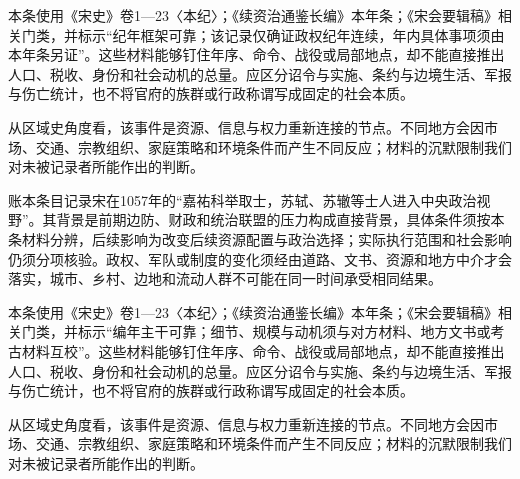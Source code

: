 本条使用《宋史》卷1—23〈本纪〉；《续资治通鉴长编》本年条；《宋会要辑稿》相关门类，并标示“纪年框架可靠；该记录仅确证政权纪年连续，年内具体事项须由本年条另证”。这些材料能够钉住年序、命令、战役或局部地点，却不能直接推出人口、税收、身份和社会动机的总量。应区分诏令与实施、条约与边境生活、军报与伤亡统计，也不将官府的族群或行政称谓写成固定的社会本质。

从区域史角度看，该事件是资源、信息与权力重新连接的节点。不同地方会因市场、交通、宗教组织、家庭策略和环境条件而产生不同反应；材料的沉默限制我们对未被记录者所能作出的判断。

账本条目记录宋在1057年的“嘉祐科举取士，苏轼、苏辙等士人进入中央政治视野”。其背景是前期边防、财政和统治联盟的压力构成直接背景，具体条件须按本条材料分辨，后续影响为改变后续资源配置与政治选择；实际执行范围和社会影响仍须分项核验。政权、军队或制度的变化须经由道路、文书、资源和地方中介才会落实，城市、乡村、边地和流动人群不可能在同一时间承受相同结果。

本条使用《宋史》卷1—23〈本纪〉；《续资治通鉴长编》本年条；《宋会要辑稿》相关门类，并标示“编年主干可靠；细节、规模与动机须与对方材料、地方文书或考古材料互校”。这些材料能够钉住年序、命令、战役或局部地点，却不能直接推出人口、税收、身份和社会动机的总量。应区分诏令与实施、条约与边境生活、军报与伤亡统计，也不将官府的族群或行政称谓写成固定的社会本质。

从区域史角度看，该事件是资源、信息与权力重新连接的节点。不同地方会因市场、交通、宗教组织、家庭策略和环境条件而产生不同反应；材料的沉默限制我们对未被记录者所能作出的判断。
